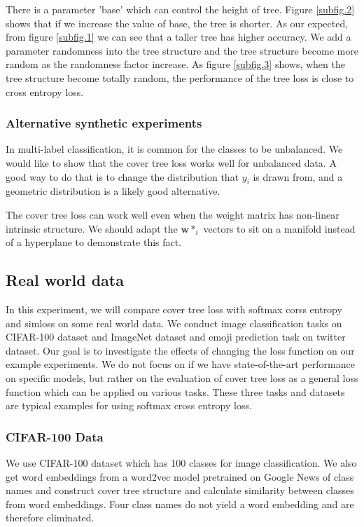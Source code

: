 \documentclass[twoside]{article}
\theoremstyle{definition}
\newcommand{\w}{\mathbf w}
\newcommand{\fixme}[1]{\noindent{\color{red}\textbf{FIXME:}  {#1}}}
\begin{document}
There is a parameter 'base' which can control the height of tree.
Figure \ref{subfig.2} shows that if we increase the value of base, the tree is shorter.
As our expected, from figure \ref{subfig.1} we can see that a taller tree has higher accuracy. 
We add a parameter randomness into the tree structure and the tree structure become more random as the randomness factor increase.
As figure \ref{subfig.3} shows, when the tree structure become totally random, the performance of the tree loss is close to cross entropy loss.


\subsubsection{Alternative synthetic experiments}

In multi-label classification, it is common for the classes to be unbalanced.
We would like to show that the cover tree loss works well for unbalanced data.
A good way to do that is to change the distribution that $y_i$ is drawn from,
and a geometric distribution is a likely good alternative.

The cover tree loss can work well even when the weight matrix has non-linear intrinsic structure.
We should adapt the $\w*_i$ vectors to sit on a manifold instead of a hyperplane to demonstrate this fact.


\subsection{Real world data}
In this experiment, we will compare cover tree loss with softmax corss entropy and simloss on some real world data.
We conduct image classification tasks on CIFAR-100 dataset and ImageNet dataset and emoji prediction task on twitter dataset.
Our goal is to investigate the effects of changing the loss function on our example experiments.
We do not focus on if we have state-of-the-art performance on specific models, but rather on the evaluation of cover tree loss as a general loss function which can be applied on various tasks.
These three tasks and datasets are typical examples for using softmax cross entropy loss.

\subsubsection{CIFAR-100 Data}
We use CIFAR-100 dataset which has 100 classes for image classification.
We also get word embeddings from a word2vec model pretrained on Google News \cite{Mikolov2013EfficientEO} of class names and construct cover tree structure and calculate similarity between classes from word embeddings.
Four class names do not yield a word embedding and are therefore eliminated.
\end{document}
